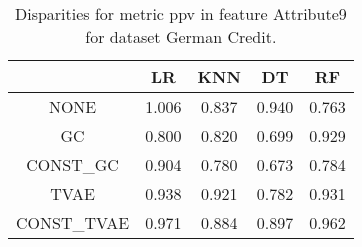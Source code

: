 \begin{table}
\caption{Disparities for metric ppv in feature Attribute9 for dataset German Credit.}
\label{tab:disp-GERMAN CREDIT-Attribute9-ppv}
\begin{tabular}{ccccc}
\toprule
 & LR & KNN & DT & RF \\
\midrule
NONE & 1.006 & 0.837 & 0.940 & 0.763 \\
GC & 0.800 & 0.820 & 0.699 & 0.929 \\
CONST\_GC & 0.904 & 0.780 & 0.673 & 0.784 \\
TVAE & 0.938 & 0.921 & 0.782 & 0.931 \\
CONST\_TVAE & 0.971 & 0.884 & 0.897 & 0.962 \\
\bottomrule
\end{tabular}
\end{table}
